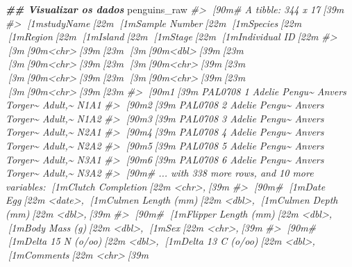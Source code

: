\documentclass[
]{book}
\newenvironment{Shaded}{\begin{snugshade}}{\end{snugshade}}
\newcommand{\CommentTok}[1]{\textcolor[rgb]{0.37,0.37,0.37}{\textit{#1}}}
\newcommand{\DocumentationTok}[1]{\textcolor[rgb]{0.37,0.37,0.37}{\textbf{\textit{#1}}}}
\newcommand{\NormalTok}[1]{#1}
\begin{document}
\begin{Shaded}
\begin{Highlighting}[]
\DocumentationTok{\#\# Visualizar os dados}
\NormalTok{penguins\_raw}
\CommentTok{\#\textgreater{} [90m\# A tibble: 344 x 17[39m}
\CommentTok{\#\textgreater{}   [1mstudyName[22m [1m\textasciigrave{}Sample Number\textasciigrave{}[22m [1mSpecies[22m       [1mRegion[22m [1mIsland[22m  [1mStage[22m   [1m\textasciigrave{}Individual ID\textasciigrave{}[22m}
\CommentTok{\#\textgreater{}   [3m[90m\textless{}chr\textgreater{}[39m[23m               [3m[90m\textless{}dbl\textgreater{}[39m[23m [3m[90m\textless{}chr\textgreater{}[39m[23m         [3m[90m\textless{}chr\textgreater{}[39m[23m  [3m[90m\textless{}chr\textgreater{}[39m[23m   [3m[90m\textless{}chr\textgreater{}[39m[23m   [3m[90m\textless{}chr\textgreater{}[39m[23m          }
\CommentTok{\#\textgreater{} [90m1[39m PAL0708                 1 Adelie Pengu\textasciitilde{} Anvers Torger\textasciitilde{} Adult,\textasciitilde{} N1A1           }
\CommentTok{\#\textgreater{} [90m2[39m PAL0708                 2 Adelie Pengu\textasciitilde{} Anvers Torger\textasciitilde{} Adult,\textasciitilde{} N1A2           }
\CommentTok{\#\textgreater{} [90m3[39m PAL0708                 3 Adelie Pengu\textasciitilde{} Anvers Torger\textasciitilde{} Adult,\textasciitilde{} N2A1           }
\CommentTok{\#\textgreater{} [90m4[39m PAL0708                 4 Adelie Pengu\textasciitilde{} Anvers Torger\textasciitilde{} Adult,\textasciitilde{} N2A2           }
\CommentTok{\#\textgreater{} [90m5[39m PAL0708                 5 Adelie Pengu\textasciitilde{} Anvers Torger\textasciitilde{} Adult,\textasciitilde{} N3A1           }
\CommentTok{\#\textgreater{} [90m6[39m PAL0708                 6 Adelie Pengu\textasciitilde{} Anvers Torger\textasciitilde{} Adult,\textasciitilde{} N3A2           }
\CommentTok{\#\textgreater{} [90m\# ... with 338 more rows, and 10 more variables: [1mClutch Completion[22m \textless{}chr\textgreater{},[39m}
\CommentTok{\#\textgreater{} [90m\#   [1mDate Egg[22m \textless{}date\textgreater{}, [1mCulmen Length (mm)[22m \textless{}dbl\textgreater{}, [1mCulmen Depth (mm)[22m \textless{}dbl\textgreater{},[39m}
\CommentTok{\#\textgreater{} [90m\#   [1mFlipper Length (mm)[22m \textless{}dbl\textgreater{}, [1mBody Mass (g)[22m \textless{}dbl\textgreater{}, [1mSex[22m \textless{}chr\textgreater{},[39m}
\CommentTok{\#\textgreater{} [90m\#   [1mDelta 15 N (o/oo)[22m \textless{}dbl\textgreater{}, [1mDelta 13 C (o/oo)[22m \textless{}dbl\textgreater{}, [1mComments[22m \textless{}chr\textgreater{}[39m}


\end{Highlighting}
\end{Shaded}
\end{document}
